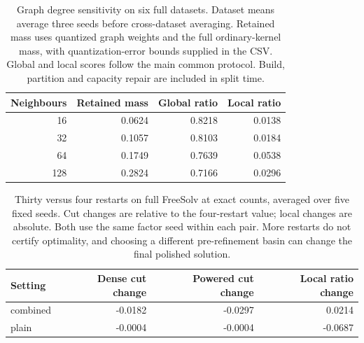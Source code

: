 \begin{table}[htbp]\centering\small
\begin{tabular}{rrrr}
\toprule
Neighbours & Retained mass & Global ratio & Local ratio \\
\midrule
16 & 0.0624 & 0.8218 & 0.0138 \\
32 & 0.1057 & 0.8103 & 0.0184 \\
64 & 0.1749 & 0.7639 & 0.0538 \\
128 & 0.2824 & 0.7166 & 0.0296 \\
\bottomrule
\end{tabular}

\caption{Graph degree sensitivity on six full datasets. Dataset means average three seeds before cross-dataset averaging. Retained mass uses quantized graph weights and the full ordinary-kernel mass, with quantization-error bounds supplied in the CSV. Global and local scores follow the main common protocol. Build, partition and capacity repair are included in split time.}\end{table}
\begin{table}[htbp]\centering\small
\begin{tabular}{lrrr}
\toprule
Setting & Dense cut change & Powered cut change & Local ratio change \\
\midrule
combined & -0.0182 & -0.0297 & 0.0214 \\
plain & -0.0004 & -0.0004 & -0.0687 \\
\bottomrule
\end{tabular}

\caption{Thirty versus four restarts on full FreeSolv at exact counts, averaged over five fixed seeds. Cut changes are relative to the four-restart value; local changes are absolute. Both use the same factor seed within each pair. More restarts do not certify optimality, and choosing a different pre-refinement basin can change the final polished solution.}\end{table}
